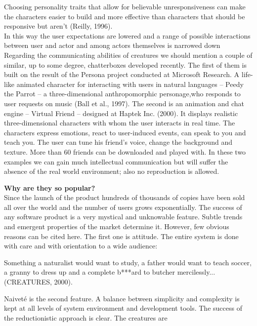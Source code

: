 \documentclass[11pt,twoside,a4paper]{article}
\begin{document}
Choosing personality traits that allow for believable unresponsiveness can make the characters easier to build and more effective than characters that should be responsive but aren't (Reilly, 1996).~\\

In this way the user expectations are lowered and a range of possible interactions between user and actor and among actors themselves is narrowed down~\\

Regarding the communicating abilities of creatures we should mention a couple of similar, up to some degree, chatterboxes developed recently. The first of them is built on the result of the Persona project conducted at Microsoft Research. A life-like animated character for interacting with users in natural languages -- Peedy the Parrot -- a three-dimensional anthropomorphic personage,who responds to user requests on music (Ball et al., 1997). The second is an animation and chat engine -- Virtual Friend -- designed at Haptek Inc. (2000). It displays realistic three-dimensional characters with whom the user interacts in real time. The characters express emotions, react to user-induced events, can speak to you and teach you. The user can tune his friend's voice, change the background and texture. More than 60 friends can be downloaded and played with. In these two examples we can gain much intellectual communication but will suffer the absence of the real world environment; also no reproduction is allowed.~\\

\clearpage

\textbf{Why are they so popular?}~\\

Since the launch of the product hundreds of thousands of copies have been sold all over the world and the number of users grows exponentially. The success of any software product is a very mystical and unknowable feature. Subtle trends and emergent properties of the market determine it. However, few obvious reasons can be cited here. The first one is attitude. The entire system is done with care and with orientation to a wide audience:

Something a naturalist would want to study, a father would want to teach soccer, a granny to dress up and a complete b***ard to butcher mercilessly...(CREATURES, 2000).

Naiveté is the second feature. A balance between simplicity and complexity is kept at all levels of system environment and development tools. The success of the reductionistic approach is clear. The creatures are
\end{document}
